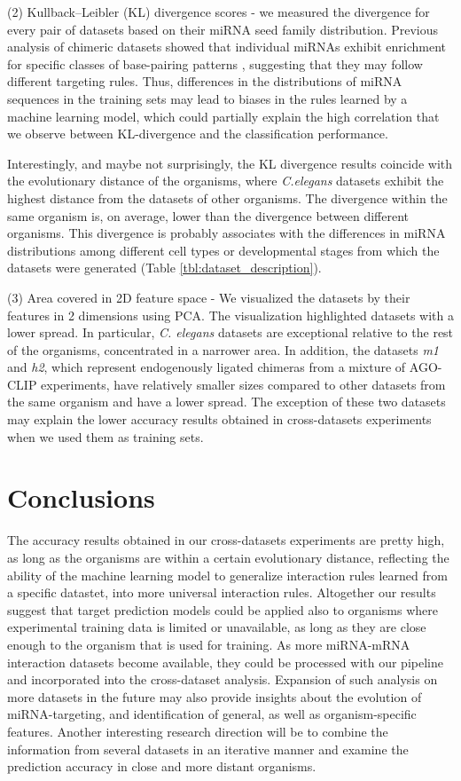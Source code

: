 \documentclass{bmcart}
\begin{document}
(2) Kullback–Leibler (KL) divergence scores -  we measured the divergence for every pair of datasets based on their miRNA seed family distribution. Previous analysis of chimeric datasets showed that individual miRNAs exhibit enrichment for specific classes of base-pairing patterns \cite{helwak2013mapping, broughton2016pairing}, suggesting that they may follow different targeting rules.
Thus, differences in the distributions of miRNA sequences in the training sets may lead to biases in the rules learned by a machine learning model, which could partially explain the high correlation that we observe between KL-divergence and the classification performance.  

Interestingly, and maybe not surprisingly, the KL divergence results coincide with the evolutionary distance of the organisms, where \textit{C.elegans} datasets exhibit the highest distance from the datasets of other organisms. The divergence within the same organism is, on average, lower than the divergence between different organisms. This divergence is probably associates with the differences in miRNA distributions among different cell types or developmental stages from which the datasets were generated (Table \ref{tbl:dataset_description}). 

(3) Area covered in 2D feature space - We visualized the datasets by their features in 2 dimensions using PCA. The visualization highlighted datasets with a lower spread. In particular, \textit{C. elegans} datasets are exceptional relative to the rest of the organisms, concentrated in a narrower area. In addition, the datasets \textit{m1} and \textit{h2}, which represent endogenously ligated chimeras from a mixture of AGO-CLIP experiments, have relatively smaller sizes compared to other datasets from the same organism and have a lower spread. The exception of these two datasets may explain the lower accuracy results obtained in cross-datasets experiments when we used them as training sets.


\section*{Conclusions}
The accuracy results obtained in our cross-datasets experiments are pretty high, as long as the organisms are within a certain evolutionary distance, reflecting the ability of the machine learning model to generalize interaction rules learned from a specific datastet, into more universal interaction rules. Altogether our results suggest that target prediction models could be applied also to organisms where experimental training data is limited or unavailable, as long as they are close enough to the organism that is used for training.
As more miRNA-mRNA interaction datasets become available, they could be processed with our pipeline and incorporated into the cross-dataset analysis. Expansion of such analysis on more datasets in the future may also provide insights about the evolution of miRNA-targeting, and identification of general, as well as organism-specific features. Another interesting research direction will be to combine the information from several datasets in an iterative manner and examine the prediction accuracy in close and more distant organisms.
\end{document}
